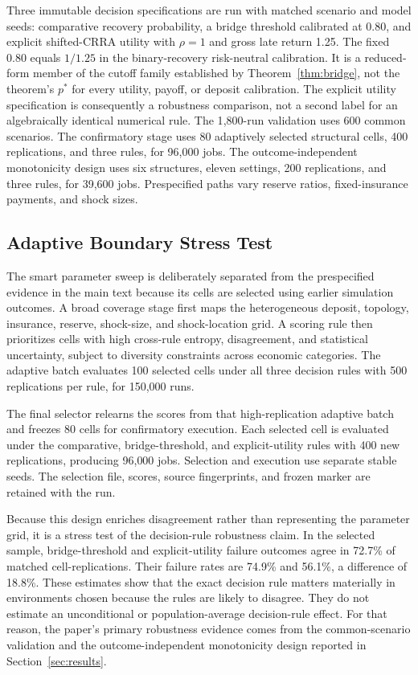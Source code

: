 \documentclass[12pt]{article}\usepackage[]{graphicx}\usepackage[]{xcolor}
\begin{document}
Three immutable decision specifications are run with matched scenario and model seeds: comparative recovery probability, a bridge threshold calibrated at 0.80, and explicit shifted-CRRA utility with $\rho=1$ and gross late return 1.25.
The fixed 0.80 equals $1/1.25$ in the binary-recovery risk-neutral calibration.
It is a reduced-form member of the cutoff family established by Theorem~\ref{thm:bridge}, not the theorem's $p^*$ for every utility, payoff, or deposit calibration.
The explicit utility specification is consequently a robustness comparison, not a second label for an algebraically identical numerical rule.
The 1{,}800-run validation uses 600 common scenarios.
The confirmatory stage uses 80 adaptively selected structural cells, 400 replications, and three rules, for 96{,}000 jobs.
The outcome-independent monotonicity design uses six structures, eleven settings, 200 replications, and three rules, for 39{,}600 jobs.
Prespecified paths vary reserve ratios, fixed-insurance payments, and shock sizes.

\subsection{Adaptive Boundary Stress Test}
\label{app:adaptive}

The smart parameter sweep is deliberately separated from the prespecified evidence in the main text because its cells are selected using earlier simulation outcomes.
A broad coverage stage first maps the heterogeneous deposit, topology, insurance, reserve, shock-size, and shock-location grid.
A scoring rule then prioritizes cells with high cross-rule entropy, disagreement, and statistical uncertainty, subject to diversity constraints across economic categories.
The adaptive batch evaluates 100 selected cells under all three decision rules with 500 replications per rule, for 150{,}000 runs.

The final selector relearns the scores from that high-replication adaptive batch and freezes 80 cells for confirmatory execution.
Each selected cell is evaluated under the comparative, bridge-threshold, and explicit-utility rules with 400 new replications, producing 96{,}000 jobs.
Selection and execution use separate stable seeds.
The selection file, scores, source fingerprints, and frozen marker are retained with the run.

Because this design enriches disagreement rather than representing the parameter grid, it is a stress test of the decision-rule robustness claim.
In the selected sample, bridge-threshold and explicit-utility failure outcomes agree in 72.7\% of matched cell-replications.
Their failure rates are 74.9\% and 56.1\%, a difference of 18.8\%.
These estimates show that the exact decision rule matters materially in environments chosen because the rules are likely to disagree.
They do not estimate an unconditional or population-average decision-rule effect.
For that reason, the paper's primary robustness evidence comes from the common-scenario validation and the outcome-independent monotonicity design reported in Section~\ref{sec:results}.
\end{document}
